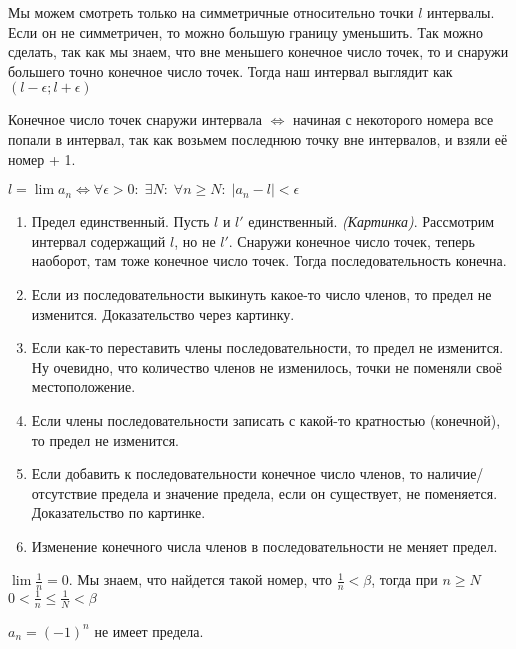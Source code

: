 \begin{remark}
    Мы можем смотреть только на симметричные относительно точки $l$ интервалы. Если он не симметричен, то можно большую границу уменьшить. Так можно сделать, так как мы знаем, что вне меньшего конечное число точек, то и снаружи большего точно конечное число точек. Тогда наш интервал выглядит как $(l - \epsilon; l + \epsilon)$
\end{remark}
\begin{remark}
    Конечное число точек снаружи интервала $\iff$ начиная с некоторого номера все попали в интервал, так как возьмем последнюю точку вне интервалов, и взяли её номер + 1.
\end{remark}
\begin{definition}
    $l = \lim a_n \iff \forall \epsilon > 0: \; \exists N: \; \forall n\ge N: \;  |a_n-l| < \epsilon$
\end{definition}
\begin{enumerate}
    \item Предел единственный. Пусть $l$ и  $l'$ единственный. \emph{(Картинка)}. Рассмотрим интервал содержащий  $l$, но не  $l'$. Снаружи конечное число точек, теперь наоборот, там тоже конечное число точек. Тогда последовательность конечна.
    \item Если из последовательности выкинуть какое-то число членов, то предел не изменится. Доказательство через картинку.
    \item Если как-то переставить члены последовательности, то предел не изменится. Ну очевидно, что количество членов не изменилось, точки не поменяли своё местоположение.
    \item Если члены последовательности записать с какой-то кратностью (конечной), то предел не изменится.
    \item Если добавить к последовательности конечное число членов, то наличие/отсутствие предела и значение предела, если он существует, не поменяется. Доказательство по картинке.
    \item Изменение конечного числа членов в последовательности не меняет предел.
\end{enumerate}
\begin{example}
    $\lim \frac{1}{n} = 0$. Мы знаем, что найдется такой номер, что $\frac{1}{n} < \beta$, тогда при $n \ge N$ $0 < \frac{1}{n} \le \frac{1}{N} < \beta$
\end{example}
\begin{example}
    $a_n = (-1)^n$ не имеет предела.
\end{example}
